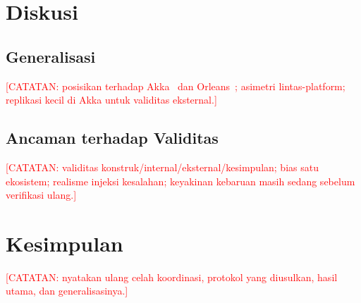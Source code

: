 \documentclass[11pt,a4paper]{report}
\newcommand{\todo}[1]{\textcolor{red}{[CATATAN: #1]}}
\begin{document}
\chapter{Diskusi}
\label{ch:disc}
\section{Generalisasi}
\todo{posisikan terhadap Akka~\cite{akkaHealth,akkaLease} dan Orleans~\cite{orleans};
asimetri lintas-platform; replikasi kecil di Akka untuk validitas eksternal.}
\section{Ancaman terhadap Validitas}
\todo{validitas konstruk/internal/eksternal/kesimpulan; bias satu ekosistem; realisme
injeksi kesalahan; keyakinan kebaruan masih sedang sebelum verifikasi ulang.}

\chapter{Kesimpulan}
\label{ch:conclusion}
\todo{nyatakan ulang celah koordinasi, protokol yang diusulkan, hasil utama, dan
generalisasinya.}




\appendix



\end{document}
